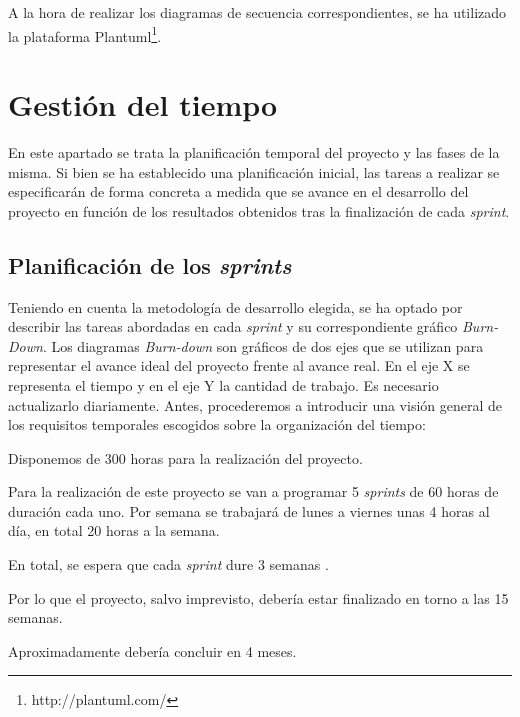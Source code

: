 A la hora de realizar los diagramas de secuencia correspondientes, se ha utilizado la plataforma Plantuml\footnote{http://plantuml.com/}.

\section{Gestión del tiempo}
En este apartado se trata la planificación temporal del proyecto y las fases de la misma. Si bien se ha  establecido una planificación inicial, las tareas a realizar se especificarán de forma concreta a medida que se avance en el desarrollo del proyecto en función de los resultados obtenidos tras la finalización de cada \textit{sprint}.

\subsection{Planificación de los \textit{sprints}}

Teniendo en cuenta la metodología de desarrollo elegida, se ha optado por describir las tareas abordadas en cada \textit{sprint} y su correspondiente gráfico \textit{Burn-Down}. Los diagramas \textit{Burn-down} son gráficos de dos ejes que se utilizan para representar el avance ideal del proyecto frente al avance real. En el eje X se representa el tiempo y en el eje Y la cantidad de trabajo. Es necesario actualizarlo diariamente. Antes, procederemos a introducir una visión general de los requisitos temporales escogidos sobre la organización del tiempo:

Disponemos de 300 horas para la realización del proyecto.

Para la realización de este proyecto se van a programar 5 \textit{sprints} de 60 horas de duración cada uno. Por semana se trabajará de lunes a viernes unas 4 horas al día, en total 20 horas a la semana.

En total, se espera que cada \textit{sprint} dure 3 semanas .

Por lo que el proyecto, salvo imprevisto, debería estar finalizado en torno a las 15 semanas. 

Aproximadamente debería concluir en 4 meses.

